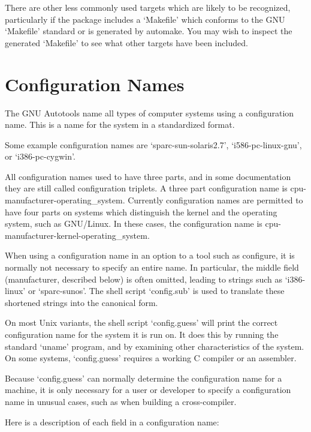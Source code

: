 \bigskip

There are other less commonly used targets which are likely to be recognized, particularly if the package includes a `Makefile' which conforms to the GNU `Makefile' standard or is generated by automake. You may wish to inspect the generated `Makefile' to see what other targets have been included. 

\section{Configuration Names}\label{S_Configuration_Names}

The GNU Autotools name all types of computer systems using a configuration name. This is a name for the system in a standardized format. 

Some example configuration names are `sparc-sun-solaris2.7', `i586-pc-linux-gnu', or `i386-pc-cygwin'. 


All configuration names used to have three parts, and in some documentation they are still called configuration triplets. A three part configuration name is cpu-manufacturer-operating\_{}system. Currently configuration names are permitted to have four parts on systems which distinguish the kernel and the operating system, such as GNU/Linux. In these cases, the configuration name is cpu-manufacturer-kernel-operating\_{}system. 


When using a configuration name in an option to a tool such as configure, it is normally not necessary to specify an entire name. In particular, the middle field (manufacturer, described below) is often omitted, leading to strings such as `i386-linux' or `sparc-sunos'. The shell script `config.sub' is used to translate these shortened strings into the canonical form. 


On most Unix variants, the shell script `config.guess' will print the correct configuration name for the system it is run on. It does this by running the standard `uname' program, and by examining other characteristics of the system. On some systems, `config.guess' requires a working C compiler or an assembler. 


Because `config.guess' can normally determine the configuration name for a machine, it is only necessary for a user or developer to specify a configuration name in unusual cases, such as when building a cross-compiler. 


Here is a description of each field in a configuration name: 

